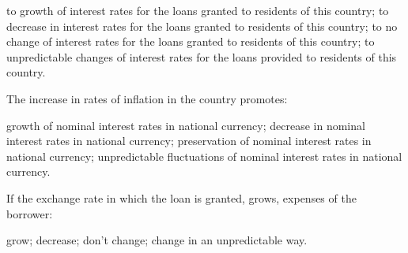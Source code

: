 \documentclass[12pt, table]{exam}
\begin{document}
\begin{questions}
\begin{multicols}{2}
	 \begin{choices}
	 \choice to growth of interest rates for the loans granted to residents of this country;
	 \choice to decrease in interest rates for the loans granted to residents of this country;
	 \CC to no change of interest rates for the loans granted to residents of this country;
	 \choice to unpredictable changes of interest rates for the loans provided to residents of this country.
	 \end{choices}
\question The increase in rates of inflation in the country promotes:
	 \begin{choices}
	 \choice growth of nominal interest rates in national currency;
	 \choice decrease in nominal interest rates in national currency;
	 \CC preservation of nominal interest rates in national currency;
	 \choice unpredictable fluctuations of nominal interest rates in national currency.
	 \end{choices}
\question If the exchange rate in which the loan is granted, grows, expenses of the borrower:
	 \begin{choices}
	 \CC grow;
	 \choice decrease;
	 \choice don't change;
	 \choice change in an unpredictable way.
	 \end{choices}



\end{multicols}
\end{questions}
\end{document}

